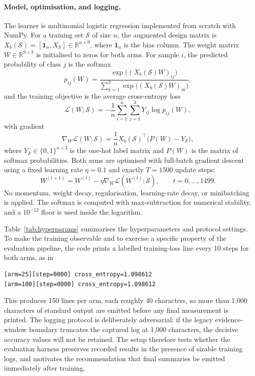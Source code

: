 \documentclass{article}
\begin{document}
\paragraph{Model, optimisation, and logging.}
The learner is multinomial logistic regression implemented from scratch with NumPy. For a training set \(\mathcal{S}\) of size \(n\), the augmented design matrix is \(X_b(\mathcal{S}) = [\mathbf{1}_n, X_{\mathcal{S}}] \in \mathbb{R}^{n \times 9}\), where \(\mathbf{1}_n\) is the bias column. The weight matrix \(W \in \mathbb{R}^{9 \times 3}\) is initialised to zeros for both arms. For sample \(i\), the predicted probability of class \(j\) is the softmax
\begin{equation}
p_{ij}(W) = \frac{\exp\!\big((X_b(\mathcal{S}) W)_{ij}\big)}{\sum_{k=1}^{3} \exp\!\big((X_b(\mathcal{S}) W)_{ik}\big)},
\end{equation}
and the training objective is the average cross-entropy loss
\begin{equation}
\mathcal{L}(W; \mathcal{S}) = -\frac{1}{n} \sum_{i=1}^{n} \sum_{j=1}^{3}
Y_{ij} \log p_{ij}(W),
\end{equation}
with gradient
\begin{equation}
\nabla_W \mathcal{L}(W; \mathcal{S}) = \frac{1}{n} X_b(\mathcal{S})^\top \big(P(W) - Y_{\mathcal{S}}\big),
\end{equation}
where \(Y_{\mathcal{S}} \in \{0,1\}^{n \times 3}\) is the one-hot label matrix and \(P(W)\) is the matrix of softmax probabilities. Both arms are optimised with full-batch gradient descent using a fixed learning rate \(\eta = 0.1\) and exactly \(T = 1500\) update steps:
\begin{equation}
W^{(t+1)} = W^{(t)} - \eta \nabla_W \mathcal{L}(W^{(t)}; \mathcal{S}), \qquad t = 0, \dots, 1499.
\end{equation}
No momentum, weight decay, regularisation, learning-rate decay, or minibatching is applied. The softmax is computed with max-subtraction for numerical stability, and a \(10^{-12}\) floor is used inside the logarithm.

Table~\ref{tab:hyperparams} summarises the hyperparameters and protocol settings. To make the training observable and to exercise a specific property of the evaluation pipeline, the code prints a labelled training-loss line every 10 steps for both arms, as in
\begin{verbatim}
[arm=25][step=0000] cross_entropy=1.098612
[arm=100][step=0000] cross_entropy=1.098612
\end{verbatim}
This produces 150 lines per arm, each roughly 40 characters, so more than 1{,}000 characters of standard output are emitted before any final measurement is printed. The logging protocol is deliberately adversarial: if the legacy evidence-window boundary truncates the captured log at 1{,}000 characters, the decisive accuracy values will not be retained. The setup therefore tests whether the evaluation harness preserves recorded results in the presence of sizable training logs, and motivates the recommendation that final summaries be emitted immediately after training.
\end{document}
